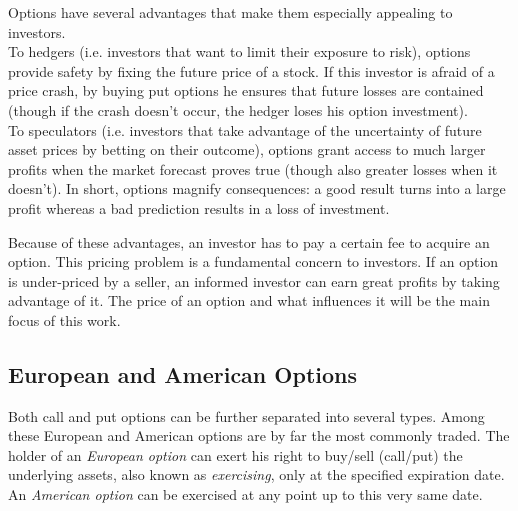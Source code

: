 \documentclass[a4paper,prd,twocolumn,nofootinbib,superscriptaddress,floatfix]{revtex4}
\begin{document}
Options have several advantages that make them especially appealing to investors.\\
To hedgers (i.e. investors that want to limit their exposure to risk), options provide safety by fixing the future price of a stock. If this investor is afraid of a price crash, by buying put options he ensures that future losses are contained (though if the crash doesn't occur, the hedger loses his option investment).\\
To speculators (i.e. investors that take advantage of the uncertainty of future asset prices by betting on their outcome), options grant access to much larger profits when the market forecast proves true (though also greater losses when it doesn't). In short, options magnify consequences: a good result turns into a large profit whereas a bad prediction results in a loss of investment.

Because of these advantages, an investor has to pay a certain fee to acquire an option. This pricing problem is a fundamental concern to investors. If an option is under-priced by a seller, an informed investor can earn great profits by taking advantage of it.
The price of an option and what influences it will be the main focus of this work.

\subsection{European and American Options}
Both call and put options can be further separated into several types. Among these European and American options are by far the most commonly traded.
The holder of an \textit{European option} can exert his right to buy/sell (call/put) the underlying assets, also known as \textit{exercising}, only at the specified expiration date.
An \textit{American option} can be exercised at any point up to this very same date.
\end{document}
